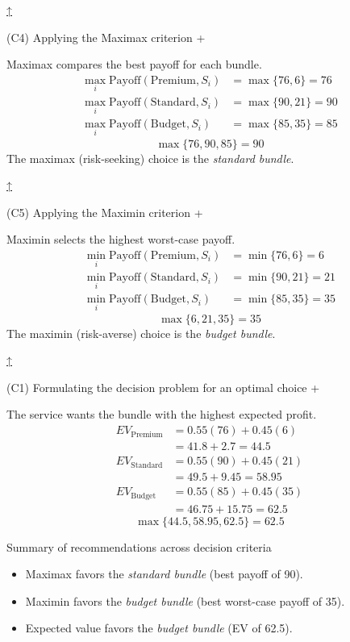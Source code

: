 \documentclass[11pt]{article}
\begin{document}
	
	
	
	\hyperref[problem4-criteria]{↑}
	
	
	
	
	(C4) Applying the Maximax criterion
	+
	
	
	Maximax compares the best payoff for each bundle.
	\[
	\begin{aligned}
		\max_i \text{Payoff}(\text{Premium}, S_i) &= \max\{76, 6\} = 76 \\
		\max_i \text{Payoff}(\text{Standard}, S_i) &= \max\{90, 21\} = 90 \\
		\max_i \text{Payoff}(\text{Budget}, S_i) &= \max\{85, 35\} = 85
	\end{aligned}
	\]
	\[
	\max\{76, 90, 85\} = 90
	\]
	The maximax (risk-seeking) choice is the \emph{standard bundle}.
	
	
	\hyperref[problem4-criteria]{↑}
	
	
	
	
	(C5) Applying the Maximin criterion
	+
	
	
	Maximin selects the highest worst-case payoff.
	\[
	\begin{aligned}
		\min_i \text{Payoff}(\text{Premium}, S_i) &= \min\{76, 6\} = 6 \\
		\min_i \text{Payoff}(\text{Standard}, S_i) &= \min\{90, 21\} = 21 \\
		\min_i \text{Payoff}(\text{Budget}, S_i) &= \min\{85, 35\} = 35
	\end{aligned}
	\]
	\[
	\max\{6, 21, 35\} = 35
	\]
	The maximin (risk-averse) choice is the \emph{budget bundle}.
	
	
	\hyperref[problem4-criteria]{↑}
	
	
	
	
	(C1) Formulating the decision problem for an optimal choice
	+
	
	
	The service wants the bundle with the highest expected profit.
	\[
	\begin{aligned}
		EV_{\text{Premium}} &= 0.55(76) + 0.45(6) \\
		&= 41.8 + 2.7 = 44.5 \\
		EV_{\text{Standard}} &= 0.55(90) + 0.45(21) \\
		&= 49.5 + 9.45 = 58.95 \\
		EV_{\text{Budget}} &= 0.55(85) + 0.45(35) \\
		&= 46.75 + 15.75 = 62.5
	\end{aligned}
	\]
	\[
	\max\{44.5, 58.95, 62.5\} = 62.5
	\]
	
	Summary of recommendations across decision criteria
	\begin{itemize}
		\item Maximax favors the \emph{standard bundle} (best payoff of 90).
		\item Maximin favors the \emph{budget bundle} (best worst-case payoff of 35).
		\item Expected value favors the \emph{budget bundle} (EV of 62.5).
	\end{itemize}
	
\end{document}
